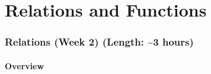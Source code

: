\documentclass[11pt]{article}
\newcommand\about{\textasciitilde}
\theoremstyle{definition}
\begin{document}

\newpage \part{Relations and Functions} 
 
\section{Relations (Week 2) (Length: \about 3 hours)}\label{s: relations}  %
\subsection{Overview}
\end{document}
